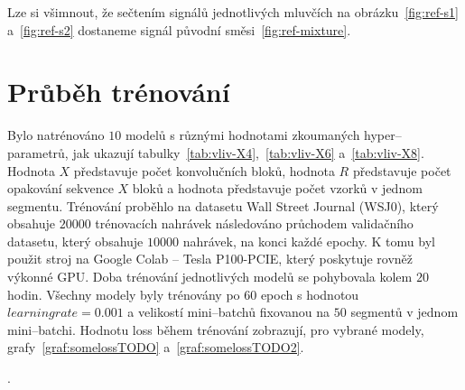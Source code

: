 Lze si všimnout, že sečtením signálů jednotlivých mluvčích na obrázku~\ref{fig:ref-s1} a~\ref{fig:ref-s2} dostaneme signál původní směsi~\ref{fig:ref-mixture}.




\section{Průběh trénování}
Bylo natrénováno $10$ modelů s různými hodnotami zkoumaných hyper--parametrů, jak ukazují tabulky~\ref{tab:vliv-X4},~\ref{tab:vliv-X6} a~\ref{tab:vliv-X8}. Hodnota $X$ představuje počet konvolučních bloků, hodnota $R$ představuje počet opakování sekvence $X$ bloků a hodnota  představuje počet vzorků v jednom segmentu. Trénování proběhlo na datasetu Wall Street Journal (WSJ0), který obsahuje $20000$ trénovacích nahrávek následováno průchodem validačního datasetu, který obsahuje $10000$ nahrávek, na konci každé epochy. K tomu byl použit stroj na Google Colab -- Tesla P100-PCIE, který poskytuje rovněž výkonné GPU. Doba trénování jednotlivých modelů se pohybovala kolem $20$ hodin. Všechny modely byly trénovány po 60 epoch s hodnotou $learning rate = 0.001$ a velikostí mini--batchů fixovanou na $50$ segmentů v jednom mini--batchi. Hodnotu loss během trénování zobrazují, pro vybrané modely, grafy~\ref{graf:somelossTODO} a~\ref{graf:somelossTODO2}.

.





